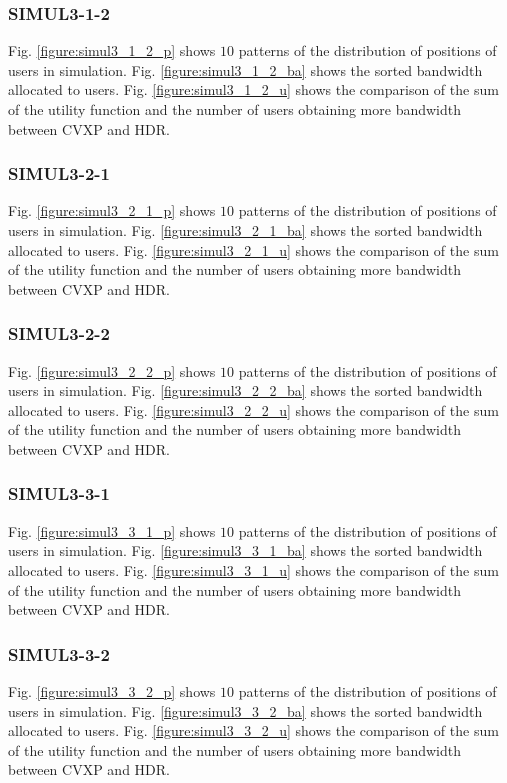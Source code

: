\subsubsection{SIMUL3-1-2}
	Fig. \ref{figure:simul3_1_2_p} shows $10$ patterns of the distribution of positions of users in simulation. Fig. \ref{figure:simul3_1_2_ba} shows the sorted bandwidth allocated to users. Fig. \ref{figure:simul3_1_2_u} shows the comparison of the sum of the utility function and the number of users obtaining more bandwidth between CVXP and HDR.
	
\subsubsection{SIMUL3-2-1}
	Fig. \ref{figure:simul3_2_1_p} shows $10$ patterns of the distribution of positions of users in simulation. Fig. \ref{figure:simul3_2_1_ba} shows the sorted bandwidth allocated to users. Fig. \ref{figure:simul3_2_1_u} shows the comparison of the sum of the utility function and the number of users obtaining more bandwidth between CVXP and HDR.
	
\subsubsection{SIMUL3-2-2}
	Fig. \ref{figure:simul3_2_2_p} shows $10$ patterns of the distribution of positions of users in simulation. Fig. \ref{figure:simul3_2_2_ba} shows the sorted bandwidth allocated to users. Fig. \ref{figure:simul3_2_2_u} shows the comparison of the sum of the utility function and the number of users obtaining more bandwidth between CVXP and HDR.
	
\subsubsection{SIMUL3-3-1}
	Fig. \ref{figure:simul3_3_1_p} shows $10$ patterns of the distribution of positions of users in simulation. Fig. \ref{figure:simul3_3_1_ba} shows the sorted bandwidth allocated to users. Fig. \ref{figure:simul3_3_1_u} shows the comparison of the sum of the utility function and the number of users obtaining more bandwidth between CVXP and HDR.
	
\subsubsection{SIMUL3-3-2}
	Fig. \ref{figure:simul3_3_2_p} shows $10$ patterns of the distribution of positions of users in simulation. Fig. \ref{figure:simul3_3_2_ba} shows the sorted bandwidth allocated to users. Fig. \ref{figure:simul3_3_2_u} shows the comparison of the sum of the utility function and the number of users obtaining more bandwidth between CVXP and HDR.
	
